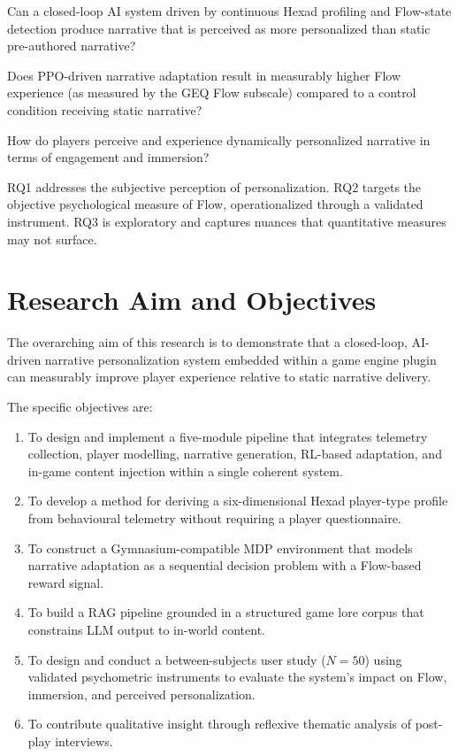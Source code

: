 \documentclass[12pt,a4paper]{report}
\begin{document}
\begin{description}[leftmargin=1cm]
\item[RQ1:] Can a closed-loop AI system driven by continuous Hexad profiling and Flow-state detection produce narrative that is perceived as more personalized than static pre-authored narrative?

\item[RQ2:] Does PPO-driven narrative adaptation result in measurably higher Flow experience (as measured by the GEQ Flow subscale) compared to a control condition receiving static narrative?

\item[RQ3:] How do players perceive and experience dynamically personalized narrative in terms of engagement and immersion?
\end{description}

RQ1 addresses the subjective perception of personalization. RQ2 targets the objective psychological measure of Flow, operationalized through a validated instrument. RQ3 is exploratory and captures nuances that quantitative measures may not surface.

\section{Research Aim and Objectives}

The overarching aim of this research is to demonstrate that a closed-loop, AI-driven narrative personalization system embedded within a game engine plugin can measurably improve player experience relative to static narrative delivery.

The specific objectives are:

\begin{enumerate}
\item To design and implement a five-module pipeline that integrates telemetry collection, player modelling, narrative generation, RL-based adaptation, and in-game content injection within a single coherent system.
\item To develop a method for deriving a six-dimensional Hexad player-type profile from behavioural telemetry without requiring a player questionnaire.
\item To construct a Gymnasium-compatible MDP environment that models narrative adaptation as a sequential decision problem with a Flow-based reward signal.
\item To build a RAG pipeline grounded in a structured game lore corpus that constrains LLM output to in-world content.
\item To design and conduct a between-subjects user study ($N = 50$) using validated psychometric instruments to evaluate the system's impact on Flow, immersion, and perceived personalization.
\item To contribute qualitative insight through reflexive thematic analysis of post-play interviews.
\end{enumerate}
\end{document}

